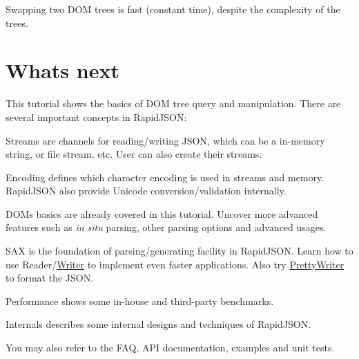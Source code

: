 Swapping two D\+OM trees is fast (constant time), despite the complexity of the trees.\hypertarget{md_Cadriciel_Commun_Externe_RapidJSON_doc_tutorial.zh-cn_WhatsNext}{}\section{What\textquotesingle{}s next}\label{md_Cadriciel_Commun_Externe_RapidJSON_doc_tutorial.zh-cn_WhatsNext}
This tutorial shows the basics of D\+OM tree query and manipulation. There are several important concepts in Rapid\+J\+S\+ON\+:


\begin{DoxyEnumerate}
\item Streams are channels for reading/writing J\+S\+ON, which can be a in-\/memory string, or file stream, etc. User can also create their streams.
\item Encoding defines which character encoding is used in streams and memory. Rapid\+J\+S\+ON also provide Unicode conversion/validation internally.
\item D\+OM\textquotesingle{}s basics are already covered in this tutorial. Uncover more advanced features such as {\itshape in situ} parsing, other parsing options and advanced usages.
\item S\+AX is the foundation of parsing/generating facility in Rapid\+J\+S\+ON. Learn how to use {\ttfamily Reader}/{\ttfamily \hyperlink{class_writer}{Writer}} to implement even faster applications. Also try {\ttfamily \hyperlink{class_pretty_writer}{Pretty\+Writer}} to format the J\+S\+ON.
\item Performance shows some in-\/house and third-\/party benchmarks.
\item Internals describes some internal designs and techniques of Rapid\+J\+S\+ON.
\end{DoxyEnumerate}

You may also refer to the F\+AQ, A\+PI documentation, examples and unit tests. 